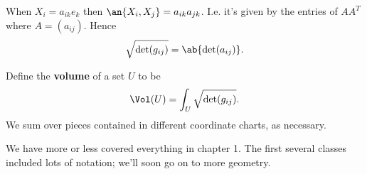 When $X_i=a_{ik}e_k$ then $\an{X_i,X_j}=a_{ik}a_{jk}$. I.e. it's given by the entries of $AA^T$ where $A=(a_{ij})$. Hence \[\sqrt{\det(g_{ij})}=\ab{\det(a_{ij})}.\]
\begin{df}
Define the \textbf{volume} of a set $U$ to be
\[
\Vol(U)=\int_U\sqrt{\det(g_{ij})}.
\]
We sum over pieces contained in different coordinate charts, as necessary.
\end{df}
\vskip0.15in
We have more or less covered everything in chapter 1. The first several classes included lots of notation; we'll soon go on to more geometry.